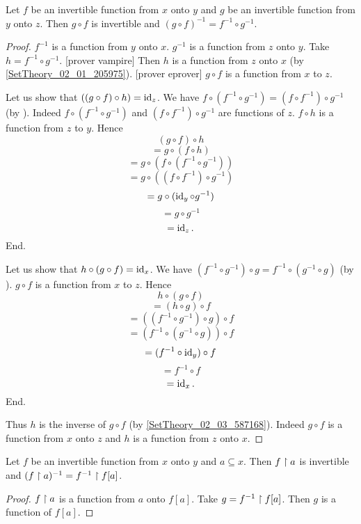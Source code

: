 \documentclass[../../set-theory.ftl.tex]{subfiles}
\begin{document}
\begin{forthel}
    \begin{proposition}\label{SetTheory_02_03_430030}
      Let $f$ be an invertible function from $x$ onto $y$ and $g$ be an invertible function from $y$ onto $z$.
      Then $g \circ f$ is invertible and $(g \circ f)^{-1} = f^{-1} \circ g^{-1}$.
    \end{proposition}
    \begin{proof}
      $f^{-1}$ is a function from $y$ onto $x$.
      $g^{-1}$ is a function from $z$ onto $y$.
      Take $h = f^{-1} \circ g^{-1}$.
      [prover vampire] %
      Then $h$ is a function from $z$ onto $x$ (by \ref{SetTheory_02_01_205975}).
      [prover eprover]
      $g \circ f$ is a function from $x$ to $z$.

      Let us show that $((g \circ f) \circ h) = \operatorname{id}_{z}$.
        We have $f \circ (f^{-1} \circ g^{-1}) = (f \circ f^{-1}) \circ g^{-1}$ (by ).
        Indeed $f \circ (f^{-1} \circ g^{-1})$ and $(f \circ f^{-1}) \circ g^{-1}$ are functions of $z$.
        $f \circ h$ is a function from $z$ to $y$.
        Hence
        \[   (g \circ f) \circ h \]
        \[ = g \circ (f \circ h) \]
        \[ = g \circ (f \circ (f^{-1} \circ g^{-1})) \]
        \[ = g \circ ((f \circ f^{-1}) \circ g^{-1}) \]
        \[ = g \circ (\operatorname{id}_{y} \circ g^{-1}) \]
        \[ = g \circ g^{-1} \]
        \[ = \operatorname{id}_{z}. \]
      End.

      Let us show that $h \circ (g \circ f) = \operatorname{id}_{x}$.
        We have $(f^{-1} \circ g^{-1}) \circ g = f^{-1} \circ (g^{-1} \circ g)$ (by ).
        $g \circ f$ is a function from $x$ to $z$.
        Hence
        \[   h \circ (g \circ f) \]
        \[ = (h \circ g) \circ f \]
        \[ = ((f^{-1} \circ g^{-1}) \circ g) \circ f \]
        \[ = (f^{-1} \circ (g^{-1} \circ g)) \circ f \]
        \[ = (f^{-1} \circ \operatorname{id}_{y}) \circ f \]
        \[ = f^{-1} \circ f \]
        \[ = \operatorname{id}_{x}. \]
      End.

      Thus $h$ is the inverse of $g \circ f$ (by \ref{SetTheory_02_03_587168}).
      Indeed $g \circ f$ is a function from $x$ onto $z$ and $h$ is a function from $z$ onto $x$.
    \end{proof}

    \begin{proposition}\label{SetTheory_02_03_908585}
      Let $f$ be an invertible function from $x$ onto $y$ and $a \subseteq x$.
      Then $f \upharpoonright a$ is invertible and $(f\upharpoonright a)^{-1} = f^{-1} \upharpoonright f[a]$.
    \end{proposition}
    \begin{proof}
      $f \upharpoonright a$ is a function from $a$ onto $f[a]$.
      Take $g = f^{-1} \upharpoonright f[a]$.
      Then $g$ is a function of $f[a]$.


\end{proof}
\end{forthel}
\end{document}
